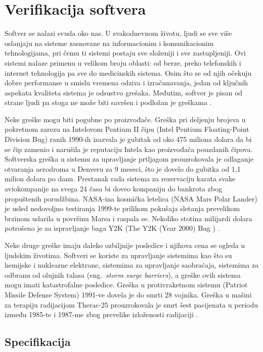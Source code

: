 \documentclass[12pt,oneside]{memoir}
\begin{document}
\chapter{Verifikacija softvera}

Softver se nalazi svuda oko nas. U svakodnevnom životu, ljudi se sve više oslanjaju na sisteme zasnovane na informacionim i komunikacionim tehnologijama, pri čemu ti sistemi postaju sve složeniji i sve zastupljeniji. Ovi sistemi nalaze primenu u velikom broju oblasti: od berze, preko telefonskih i internet tehnologija pa sve do medicinskih sistema. Osim što se od njih očekuju dobre performanse u smislu vremena odziva i izračunavanja, jedan od ključnih aspekata kvaliteta sistema je odsustvo grešaka. Međutim, softver je pisan od strane ljudi pa stoga ne može biti savršen i podložan je greškama \cite{PoMC, SoftTest}.

Neke greške mogu biti pogubne po proizvođače. Greška pri deljenju brojeva u pokretnom zarezu na Intelovom Pentium II čipu (Intel Pentium Floating-Point Division Bug) ranih 1990-ih izazvala je gubitak od oko 475 miliona dolara da bi se čip zamenio i narušila je reputaciju Intela kao proizvođača pouzdanih čipova. Softverska greška u sistemu za upravljanje prtljagom prouzrokovala je odlaganje otvaranja aerodroma u Denveru za 9 meseci, što je dovelo do gubitka od 1,1 milion dolara po danu. Prestanak rada sistema za rezervaciju karata svake aviokompanije na svega 24 časa bi doveo kompaniju do bankrota zbog propuštenih porudžbina. NASA-ina kosmička letelica (NASA Mars Polar Lander) je usled nedovoljno testiranja 1999-te prilikom pokušaja sletanja prevelikom brzinom udarila u površinu Marsa i raspala se. Nekoliko stotina milijardi dolara potrošeno je za ispravljanje baga Y2K (The Y2K (Year 2000) Bug \cite{y2k}) \cite{PoMC, SoftTest}. 

Neke druge greške imaju daleko ozbiljnije posledice i njihova cena se ogleda u ljudskim životima. Softveri se koriste za upravljanje sistemima kao što su hemijske i nuklearne elektrane, sistemima za upravljanje saobraćaja, sistemima za odbranu od olujnih talasa (eng.~\textit{storm surge barriers}), a greške ovih sistema mogu imati katastrofalne posledice. Greška u protivraketnom sistemu (Patriot Missile Defense System) 1991-ve dovela je do smrti 28 vojnika. Greška u mašini za terapiju radijacijom Therac-25 prouzrokovala je smrt šest pacijenata u periodu između 1985-te i 1987-me zbog prevelike izloženosti radijaciji  \cite{PoMC, SoftTest}.

\section{Specifikacija}
\end{document}
